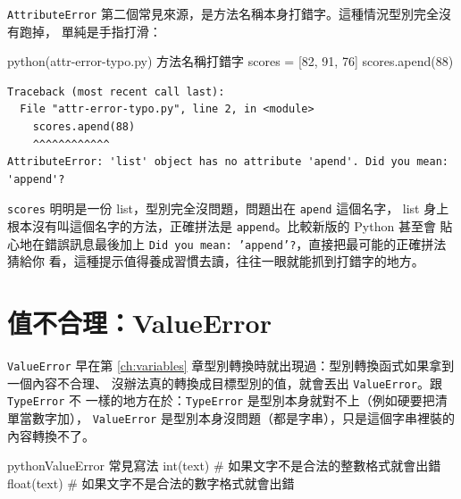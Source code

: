 \texttt{AttributeError} 第二個常見來源，是方法名稱本身打錯字。這種情況型別完全沒有跑掉，
單純是手指打滑：

\begin{example}{python}{(attr-error-typo.py) 方法名稱打錯字}
scores = [82, 91, 76]
scores.apend(88)
\end{example}

\begin{verbatim}
Traceback (most recent call last):
  File "attr-error-typo.py", line 2, in <module>
    scores.apend(88)
    ^^^^^^^^^^^^
AttributeError: 'list' object has no attribute 'apend'. Did you mean: 'append'?
\end{verbatim}

\texttt{scores} 明明是一份 list，型別完全沒問題，問題出在 \texttt{apend} 這個名字，
list 身上根本沒有叫這個名字的方法，正確拼法是 \texttt{append}。比較新版的 Python 甚至會
貼心地在錯誤訊息最後加上 \texttt{Did you mean: 'append'?}，直接把最可能的正確拼法猜給你
看，這種提示值得養成習慣去讀，往往一眼就能抓到打錯字的地方。



\section{值不合理：ValueError}
\label{sec:value-error}

\texttt{ValueError} 早在第 \ref{ch:variables} 章型別轉換時就出現過：型別轉換函式如果拿到一個內容不合理、
沒辦法真的轉換成目標型別的值，就會丟出 \texttt{ValueError}。跟 \texttt{TypeError} 不
一樣的地方在於：\texttt{TypeError} 是型別本身就對不上（例如硬要把清單當數字加），
\texttt{ValueError} 是型別本身沒問題（都是字串），只是這個字串裡裝的內容轉換不了。

\begin{code}{python}{ValueError 常見寫法}
int(text)      # 如果文字不是合法的整數格式就會出錯
float(text)    # 如果文字不是合法的數字格式就會出錯
\end{code}

